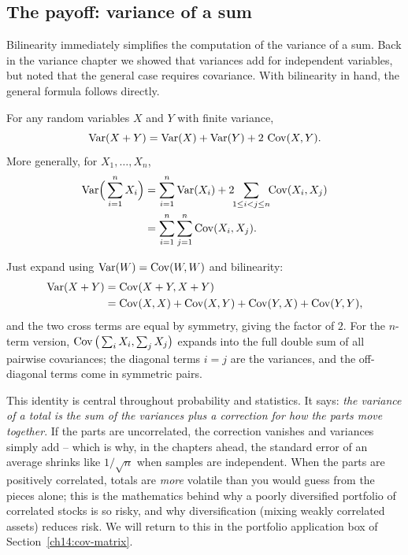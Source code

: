 \subsection{The payoff: variance of a sum}

Bilinearity immediately simplifies the computation of the variance of a sum.
Back in the variance chapter we showed that variances add for independent
variables, but noted that the general case requires covariance. With bilinearity
in hand, the general formula follows directly.

\begin{theorem}
\label{ch14:var-sum}
For any random variables $X$ and $Y$ with finite variance,
\[
\operatorname{Var}(X + Y) = \operatorname{Var}(X) + \operatorname{Var}(Y) + 2\,\operatorname{Cov}(X, Y).
\]
More generally, for $X_1, \dots, X_n$,
\begin{align*}
\operatorname{Var}\!\Big(\sum_{i=1}^n X_i\Big)
&= \sum_{i=1}^n \operatorname{Var}(X_i) + 2\!\!\sum_{1 \le i < j \le n}\!\! \operatorname{Cov}(X_i, X_j) \\
&= \sum_{i=1}^n \sum_{j=1}^n \operatorname{Cov}(X_i, X_j).
\end{align*}
\end{theorem}

\begin{whybox}
Just expand using $\operatorname{Var}(W) = \operatorname{Cov}(W, W)$ and bilinearity:
\begin{align*}
\operatorname{Var}(X+Y) &= \operatorname{Cov}(X+Y, X+Y) \\
&= \operatorname{Cov}(X,X) + \operatorname{Cov}(X,Y) + \operatorname{Cov}(Y,X) + \operatorname{Cov}(Y,Y),
\end{align*}
and the two cross terms are equal by symmetry, giving the factor of $2$. For the
$n$-term version, $\operatorname{Cov}\big(\sum_i X_i, \sum_j X_j\big)$ expands into the full
double sum of all pairwise covariances; the diagonal terms $i = j$ are the
variances, and the off-diagonal terms come in symmetric pairs.
\end{whybox}

\begin{aestheticbox}
This identity is central throughout probability and statistics.
It says: \emph{the variance of a total is the sum of the variances plus a
correction for how the parts move together}. If the parts are uncorrelated, the
correction vanishes and variances simply add -- which is why, in the chapters
ahead, the standard error of an average shrinks like $1/\sqrt{n}$ when samples are
independent. When the parts are positively correlated, totals are \emph{more}
volatile than you would guess from the pieces alone; this is the mathematics behind
why a poorly diversified portfolio of correlated stocks is so risky, and why
diversification (mixing weakly correlated assets) reduces risk. We will return to
this in the portfolio application box of Section~\ref{ch14:cov-matrix}.
\end{aestheticbox}


